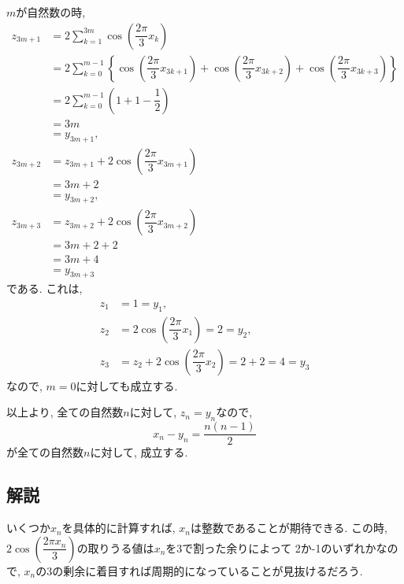 \documentclass[dvipdfmx,a4paper]{jsarticle}
\newcommand{\2}{I\hspace{-1pt}I}
\newcommand{\3}{I\hspace{-1pt}I\hspace{-1pt}I}
\begin{document}
    $m$が自然数の時, 
    \begin{align*}
        z_{3m+1} &= 2 \sum_{k=1}^{3m} \cos \left( \dfrac{2\pi}{3}x_k\right) \\
        &= 2 \sum_{k=0}^{m-1} \left\{\cos \left( \dfrac{2\pi}{3}x_{3k+1}\right) + \cos \left( \dfrac{2\pi}{3}x_{3k+2}\right) + \cos \left( \dfrac{2\pi}{3}x_{3k+3}\right)\right\} \\
        &= 2 \sum_{k=0}^{m-1} \left(1 + 1 - \dfrac{1}{2}\right) \\
        &= 3m \\
        &= y_{3m+1}, \\
        z_{3m+2} &= z_{3m+1} + 2\cos \left( \dfrac{2\pi}{3}x_{3m+1}\right)\\
        &= 3m + 2\\
        &= y_{3m+2}, \\
        z_{3m+3} &= z_{3m+2} + 2\cos \left( \dfrac{2\pi}{3}x_{3m+2}\right)\\
        &= 3m + 2 + 2\\
        &= 3m + 4\\
        &= y_{3m+3}
    \end{align*}
    である. これは, 
    \begin{align*}
        z_1 &= 1 = y_1, \\
        z_2 &= 2\cos \left( \dfrac{2\pi}{3}x_1\right) = 2 = y_2, \\
        z_3 &= z_2 + 2\cos \left( \dfrac{2\pi}{3}x_2\right) 
        = 2 + 2
        = 4
        = y_3
    \end{align*}
    なので, $m=0$に対しても成立する. 

    以上より, 全ての自然数$n$に対して, $z_n = y_n$なので, 
    \begin{equation*}
        x_n - y_n = \dfrac{n(n-1)}{2}
    \end{equation*}
    が全ての自然数$n$に対して, 成立する. 

    \subsection{解説}
    いくつか$x_n$を具体的に計算すれば, $x_n$は整数であることが期待できる. 
    この時, $2\cos\left( \dfrac{2\pi x_n}{3} \right)$の取りうる値は$x_n$を3で割った余りによって
    2か-1のいずれかなので, $x_n$の3の剰余に着目すれば周期的になっていることが見抜けるだろう. 
\end{document}

